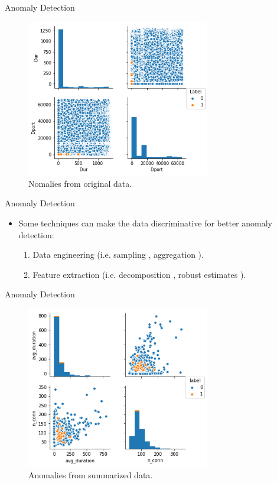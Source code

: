 \documentclass[newPxFont, numfooter, sectionpages]{beamer}
\begin{document}
\begin{frame}[c]{Anomaly Detection}
	\begin{figure}[h!]
	     \centering
	     \includegraphics[width=8cm]{figures/raw_dur_dport_pairplot.png}
	     \caption{Nomalies from original data.}
	     \label{fig:fig01}
	\end{figure}
\end{frame}

\begin{frame}[c]{Anomaly Detection}	
	\begin{itemize}
		\item Some techniques can make the data discriminative for better anomaly detection:
		\begin{enumerate}
			\item Data engineering (i.e. sampling \cite{??}, aggregation \cite{acarali2016survey}).
			\item Feature extraction (i.e. decomposition \cite{??}, robust estimates \cite{??}).
		\end{enumerate}
	\end{itemize}
\end{frame}

\begin{frame}[c]{Anomaly Detection}
	\begin{figure}[h!]
	     \centering
	     \includegraphics[width=8cm]{figures/sum_avg_duration_conn_pairplot.png}
	     \caption{Anomalies from summarized data.}
	     \label{fig:fig02}
	\end{figure}
\end{frame}
\end{document}
